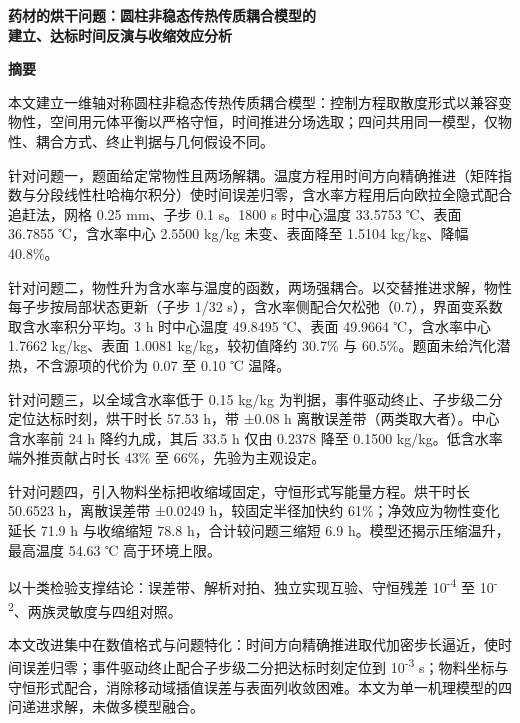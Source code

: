 \thispagestyle{plain}
{\linespread{1.25}\selectfont
\begin{center}
  {\bfseries 药材的烘干问题：圆柱非稳态传热传质耦合模型的\\[0.8em]建立、达标时间反演与收缩效应分析}
\end{center}

\vspace{0.4em}
\begin{center}\bfseries 摘要\end{center}

\vspace{0.2em}

本文建立一维轴对称圆柱非稳态传热传质耦合模型：控制方程取散度形式以兼容变物性，空间用元体平衡以严格守恒，时间推进分场选取；四问共用同一模型，仅物性、耦合方式、终止判据与几何假设不同。

针对问题一，题面给定常物性且两场解耦。温度方程用时间方向精确推进（矩阵指数与分段线性杜哈梅尔积分）使时间误差归零，含水率方程用后向欧拉全隐式配合追赶法，网格 0.25 mm、子步 0.1 s。1800 s 时中心温度 33.5753 ℃、表面 36.7855 ℃，含水率中心 2.5500 kg/kg 未变、表面降至 1.5104 kg/kg、降幅 40.8\%。

针对问题二，物性升为含水率与温度的函数，两场强耦合。以交替推进求解，物性每子步按局部状态更新（子步 1/32 s），含水率侧配合欠松弛（0.7），界面变系数取含水率积分平均。3 h 时中心温度 49.8495 ℃、表面 49.9664 ℃，含水率中心 1.7662 kg/kg、表面 1.0081 kg/kg，较初值降约 30.7\% 与 60.5\%。题面未给汽化潜热，不含源项的代价为 0.07 至 0.10 ℃ 温降。

针对问题三，以全域含水率低于 0.15 kg/kg 为判据，事件驱动终止、子步级二分定位达标时刻，烘干时长 57.53 h，带 ±0.08 h 离散误差带（两类取大者）。中心含水率前 24 h 降约九成，其后 33.5 h 仅由 0.2378 降至 0.1500 kg/kg。低含水率端外推贡献占时长 43\% 至 66\%，先验为主观设定。

针对问题四，引入物料坐标把收缩域固定，守恒形式写能量方程。烘干时长 50.6523 h，离散误差带 ±0.0249 h，较固定半径加快约 61\%；净效应为物性变化延长 71.9 h 与收缩缩短 78.8 h，合计较问题三缩短 6.9 h。模型还揭示压缩温升，最高温度 54.63 ℃ 高于环境上限。

以十类检验支撑结论：误差带、解析对拍、独立实现互验、守恒残差 10\textsuperscript{-4} 至 10\textsuperscript{-2}、两族灵敏度与四组对照。

本文改进集中在数值格式与问题特化：时间方向精确推进取代加密步长逼近，使时间误差归零；事件驱动终止配合子步级二分把达标时刻定位到 10\textsuperscript{-3} s；物料坐标与守恒形式配合，消除移动域插值误差与表面列收敛困难。本文为单一机理模型的四问递进求解，未做多模型融合。

}

\clearpage
